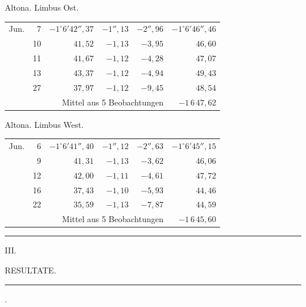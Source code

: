 \noindent\begin{minipage}[t]{.495\textwidth}\centering Altona. Limbus Ost.\par\smallskip
{\scriptsize\setlength{\tabcolsep}{1pt}\renewcommand{\arraystretch}{1.2}\begin{tabular}{lr|r|r|r|r|}
Jun.&7&$-1^\circ6'42''{,}37$&$-1''{,}13$&$-2''{,}96$&$-1^\circ6'46''{,}46$\\
&10&$41{,}52$&$-1{,}13$&$-3{,}95$&$46{,}60$\\
&11&$41{,}67$&$-1{,}12$&$-4{,}28$&$47{,}07$\\
&13&$43{,}37$&$-1{,}12$&$-4{,}94$&$49{,}43$\\
&27&$37{,}97$&$-1{,}12$&$-9{,}45$&$48{,}54$\\
\cline{6-6}\multicolumn{5}{r}{Mittel aus 5 Beobachtungen}&$-1\,6\,47{,}62$
\end{tabular}}\end{minipage}\hfill\begin{minipage}[t]{.495\textwidth}\centering Altona. Limbus West.\par\smallskip
{\scriptsize\setlength{\tabcolsep}{1pt}\renewcommand{\arraystretch}{1.2}\begin{tabular}{lr|r|r|r|r}
Jun.&6&$-1^\circ6'41''{,}40$&$-1''{,}12$&$-2''{,}63$&$-1^\circ6'45''{,}15$\\
&9&$41{,}31$&$-1{,}13$&$-3{,}62$&$46{,}06$\\
&12&$42{,}00$&$-1{,}11$&$-4{,}61$&$47{,}72$\\
&16&$37{,}43$&$-1{,}10$&$-5{,}93$&$44{,}46$\\
&22&$35{,}59$&$-1{,}13$&$-7{,}87$&$44{,}59$\\
\cline{6-6}\multicolumn{5}{r}{Mittel aus 5 Beobachtungen}&$-1\,6\,45{,}60$
\end{tabular}}\end{minipage}
\par\vspace{4mm}
\begin{center}\rule{.23\textwidth}{.4pt}\end{center}

\clearpage
\vspace*{18mm}
\begin{center}
{\large III.}\par\medskip
{\Large RESULTATE.}\par\medskip
\rule{.09\textwidth}{.4pt}\par{}.
\end{center}

